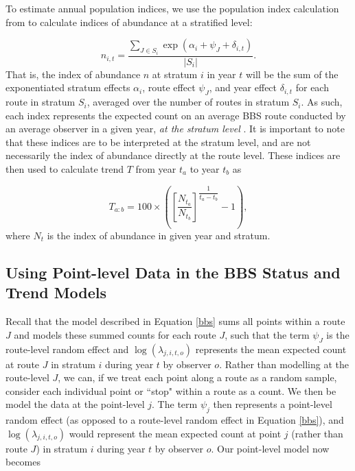 \par To estimate annual population indices, we use the population index calculation from \citet{smith_north_2021} to calculate indices of abundance at a stratified level:

\begin{equation}\label{index}
	n_{i,t} = \dfrac{\sum_{J\in S_i}\exp(\alpha_i + \psi_J + \delta_{i,t})}{|S_i|}.
\end{equation}
That is, the index of abundance $n$ at stratum $i$ in year $t$ will be the sum of the exponentiated stratum effects $\alpha_i$, route effect $\psi_J$, and year effect $\delta_{i,t}$ for each route in stratum $S_i$, averaged over the number of routes in stratum $S_i$.
As such, each index represents the expected count on an average BBS route conducted by an average observer in a given year, \textit{at the stratum level} \citep{smith_north_2021}.
It is important to note that these indices are to be interpreted at the stratum level, and are not necessarily the index of abundance directly at the route level.
These indices are then used to calculate trend $T$ from year $t_a$ to year $t_b$ as

\begin{equation*}
	T_{a:b} = 100 \times \left( \left[ \dfrac{N_{t_a}}{N_{t_b}}\right] ^ {\dfrac{1}{t_a - t_b}}  - 1 \right),
\end{equation*}
where $N_t$ is the index of abundance in given year and stratum.

\subsection{Using Point-level Data in the BBS Status and Trend Models}\label{point-description}

\par Recall that the model described in Equation \ref{bbs} sums all points within a route $J$ and models these summed counts for each route $J$, such that the term $\psi_J$ is the route-level random effect and $\log(\lambda_{j,i,t,o})$ represents the mean expected count at route $J$ in stratum $i$ during year $t$ by observer $o$.
Rather than modelling at the route-level $J$, we can, if we treat each point along a route as a random sample, consider each individual point or ``stop" within a route as a count.
We then be model the data at the point-level $j$.
The term $\psi_j$ then represents a point-level random effect (as opposed to a route-level random effect in Equation \ref{bbs}), and $\log(\lambda_{j,i,t,o})$ would represent the mean expected count at point $j$ (rather than route $J$) in stratum $i$ during year $t$ by observer $o$. 
Our point-level model now becomes

